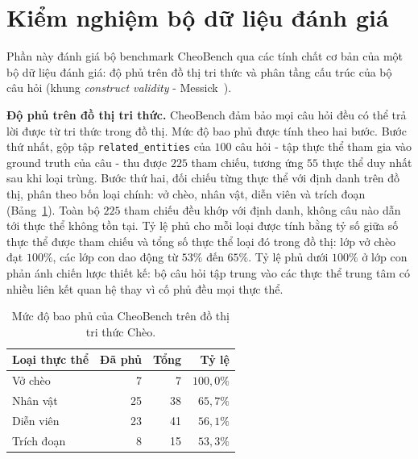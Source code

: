 
\section{Kiểm nghiệm bộ dữ liệu đánh giá}
\label{sec:benchmark_validity}

Phần này đánh giá bộ benchmark CheoBench qua các tính chất cơ bản của một bộ dữ liệu đánh giá: độ phủ trên đồ thị tri thức và phân tầng cấu trúc của bộ câu hỏi (khung \textit{construct validity} - Messick~\cite{messick1995validity}).

\textbf{Độ phủ trên đồ thị tri thức.}
CheoBench đảm bảo mọi câu hỏi đều có thể trả lời được từ tri thức trong đồ thị. Mức độ bao phủ được tính theo hai bước. Bước thứ nhất, gộp tập \texttt{related\_entities} của $100$ câu hỏi - tập thực thể tham gia vào ground truth của câu - thu được $225$ tham chiếu, tương ứng $55$ thực thể duy nhất sau khi loại trùng. Bước thứ hai, đối chiếu từng thực thể với định danh trên đồ thị, phân theo bốn loại chính: vở chèo, nhân vật, diễn viên và trích đoạn (Bảng~\ref{tab:coverage_entity}). Toàn bộ $225$ tham chiếu đều khớp với định danh, không câu nào dẫn tới thực thể không tồn tại. Tỷ lệ phủ cho mỗi loại được tính bằng tỷ số giữa số thực thể được tham chiếu và tổng số thực thể loại đó trong đồ thị: lớp vở chèo đạt $100\%$, các lớp con dao động từ $53\%$ đến $65\%$. Tỷ lệ phủ dưới $100\%$ ở lớp con phản ánh chiến lược thiết kế: bộ câu hỏi tập trung vào các thực thể trung tâm có nhiều liên kết quan hệ thay vì cố phủ đều mọi thực thể.

\begin{table}[h]
\centering
\caption{Mức độ bao phủ của CheoBench trên đồ thị tri thức Chèo.}
\label{tab:coverage_entity}
\renewcommand{\arraystretch}{1.2}
\begin{tabular}{lrrr}
\hline
\textbf{Loại thực thể} & \textbf{Đã phủ} & \textbf{Tổng} & \textbf{Tỷ lệ} \\
\hline
Vở chèo       &  7 &  7 & $100,0\%$ \\
Nhân vật      & 25 & 38 &  $65,7\%$ \\
Diễn viên     & 23 & 41 &  $56,1\%$ \\
Trích đoạn    &  8 & 15 &  $53,3\%$ \\
\hline
\end{tabular}
\end{table}

